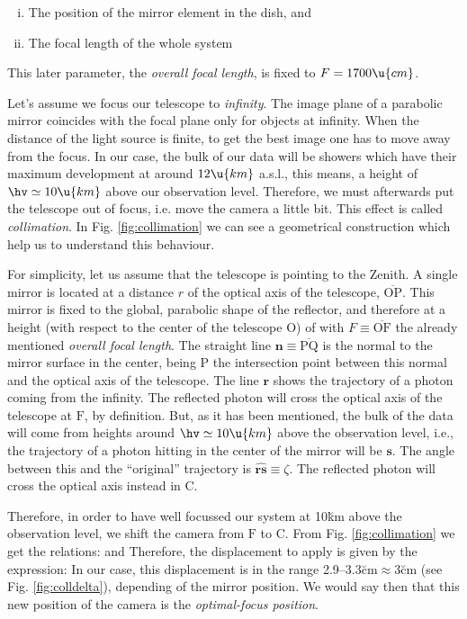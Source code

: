 \begin{enumerate}[i.]
\item The position of the mirror element in the dish, and
\item The focal length of the whole system
\end{enumerate}

This later parameter, the \emph{overall focal length}, is fixed to
$F=1700\u{cm}$. 

Let's assume we focus our telescope to \emph{infinity}.  The image
plane of a parabolic mirror coincides with the focal plane only for
objects at infinity. When the distance of the light source is finite,
to get the best image one has to move away from the focus. In our
case, the bulk of our data will be showers which have their maximum
development at around $12\u{km}$ a.s.l., this means, a height of
$\hv\simeq 10\u{km}$ above our observation level.  Therefore, we must
afterwards put the telescope out of focus, i.e. move the camera a
little bit. This effect is called \emph{collimation}. In Fig.
\ref{fig:collimation} we can see a geometrical construction which help
us to understand this behaviour.

For simplicity, let us assume that the telescope is pointing to the
Zenith. A single mirror is located at a distance $r$ of the optical
axis of the telescope, $\overline{\mathrm{OP}}$. This mirror is fixed
to the global, parabolic shape of the reflector, and therefore at a
height (with respect to the center of the telescope $\mathrm{O}$) of
%
\zparabeq
%
with $F\equiv\overline{\mathrm{OF}}$ the already mentioned
\emph{overall focal length}. The straight line
$\mathbf{n}\equiv\overline{\mathrm{PQ}}$ is the normal to the mirror
surface in the center, being $\mathrm{P}$ the intersection point
between this normal and the optical axis of the telescope. The line
$\mathbf{r}$ shows the trajectory of a photon coming from the
infinity. The reflected photon will cross the optical axis of the
telescope at $\mathrm{F}$, by definition. But, as it has been
mentioned, the bulk of the data will come from heights around
$\hv\simeq 10\u{km}$ above the observation level, i.e., the trajectory
of a photon hitting in the center of the mirror will be $\mathbf{s}$.
The angle between this and the ``original'' trajectory is
$\widehat{\mathbf{rs}}\equiv\zeta$. The reflected photon will cross
the optical axis instead in $\mathrm{C}$.

\collimationfig
%
Therefore, in order to have well focussed our system at 10\u{km} above
the observation level, we shift the camera from $\mathrm{F}$ to
$\mathrm{C}$. From Fig. \ref{fig:collimation} we get the relations:
%
\relationsAeq
%
and
%
\relationsBeq
%
Therefore, the displacement to apply is given by the expression:
%
\collimationeq
%
In our case, this displacement is in the range
2.9--3.3\u{cm}$\approx$3\u{cm} (see Fig. \ref{fig:colldelta}),
depending of the mirror position. We would say then that this new
position of the camera is the \emph{optimal-focus position}.


